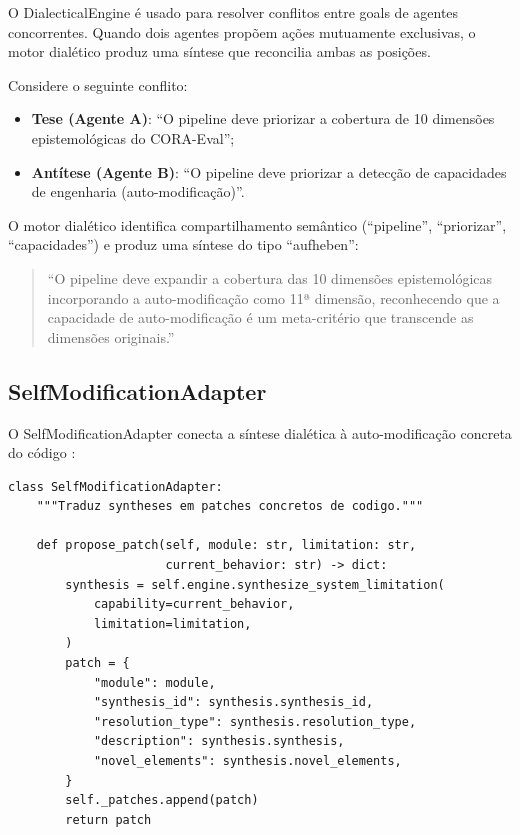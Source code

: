 O DialecticalEngine é usado para resolver conflitos entre goals de
agentes concorrentes. Quando dois agentes propõem ações mutuamente
exclusivas, o motor dialético produz uma síntese que reconcilia ambas
as posições.

\begin{exemplo}
Considere o seguinte conflito:
\begin{itemize}
\item \textbf{Tese (Agente A)}: ``O pipeline deve priorizar a
cobertura de 10 dimensões epistemológicas do CORA-Eval'';
\item \textbf{Antítese (Agente B)}: ``O pipeline deve priorizar a
detecção de capacidades de engenharia (auto-modificação)''.
\end{itemize}
O motor dialético identifica compartilhamento semântico (``pipeline'',
``priorizar'', ``capacidades'') e produz uma síntese do tipo
``aufheben'':
\begin{quote}
``O pipeline deve expandir a cobertura das 10 dimensões
epistemológicas incorporando a auto-modificação como 11ª dimensão,
reconhecendo que a capacidade de auto-modificação é um meta-critério
que transcende as dimensões originais.''
\end{quote}
\end{exemplo}

\subsection{SelfModificationAdapter}

O SelfModificationAdapter conecta a síntese dialética à
auto-modificação concreta do código \cite{opencode2026spec036}:

\begin{lstlisting}[style=pythonstyle]
class SelfModificationAdapter:
    """Traduz syntheses em patches concretos de codigo."""

    def propose_patch(self, module: str, limitation: str,
                      current_behavior: str) -> dict:
        synthesis = self.engine.synthesize_system_limitation(
            capability=current_behavior,
            limitation=limitation,
        )
        patch = {
            "module": module,
            "synthesis_id": synthesis.synthesis_id,
            "resolution_type": synthesis.resolution_type,
            "description": synthesis.synthesis,
            "novel_elements": synthesis.novel_elements,
        }
        self._patches.append(patch)
        return patch
\end{lstlisting}

